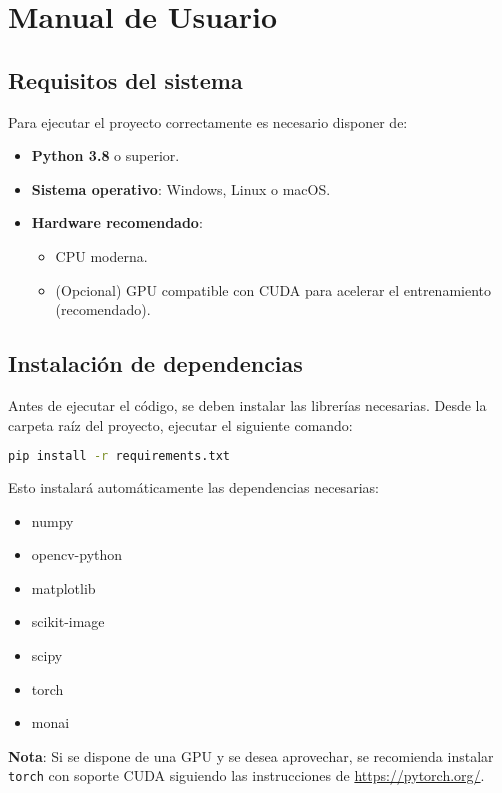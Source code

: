 \documentclass[12pt]{article}
\begin{document}
\section{Manual de Usuario}
\subsection{Requisitos del sistema}
Para ejecutar el proyecto correctamente es necesario disponer de:

\begin{itemize}
    \item \textbf{Python 3.8} o superior.
    \item \textbf{Sistema operativo}: Windows, Linux o macOS.
    \item \textbf{Hardware recomendado}:
    \begin{itemize}
        \item CPU moderna.
        \item (Opcional) GPU compatible con CUDA para acelerar el entrenamiento (recomendado).
    \end{itemize}
\end{itemize}

\subsection{Instalación de dependencias}

Antes de ejecutar el código, se deben instalar las librerías necesarias.  
Desde la carpeta raíz del proyecto, ejecutar el siguiente comando:

\begin{lstlisting}[language=bash]
pip install -r requirements.txt
\end{lstlisting}

Esto instalará automáticamente las dependencias necesarias:
\begin{itemize}
    \item numpy
    \item opencv-python
    \item matplotlib
    \item scikit-image
    \item scipy
    \item torch
    \item monai
\end{itemize}

\textbf{Nota}: Si se dispone de una GPU y se desea aprovechar, se recomienda instalar \texttt{torch} con soporte CUDA siguiendo las instrucciones de \url{https://pytorch.org/}.
\end{document}
